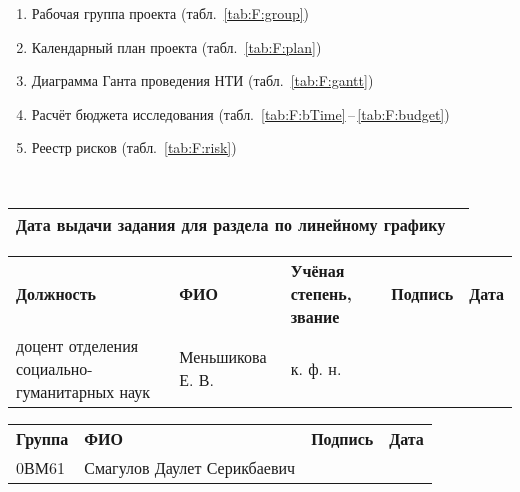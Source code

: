 \begin{longtable}
{{\begin{itshape}
\begin{enumerate}[labelsep=4pt,topsep=0pt,leftmargin=4pt]
    \item Рабочая группа проекта (табл.~\ref{tab:F:group})
    \item Календарный план проекта (табл.~\ref{tab:F:plan})
    \item Диаграмма Ганта проведения НТИ (табл.~\ref{tab:F:gantt})
    \item Расчёт бюджета исследования (табл.~\ref{tab:F:bTime}\,--\,\ref{tab:F:budget})
    \item Реестр рисков (табл.~\ref{tab:F:risk})
\end{enumerate}
\end{itshape}
}}
\\ \hline

\end{longtable}


\begin{tabularx}{\textwidth}
{|>{\hsize}L|>{\hsize}L|} \hline
\textbf{Дата выдачи задания для раздела по линейному графику}\bigstrut &
\\ \hline
\end{tabularx}

\vspace{2ex}

\begin{tabularx}{\textwidth}
{|>{\hsize}Y|>{\hsize}Y|>{\hsize}Y|>{\hsize}Y|>{\hsize}Y|}
     \bigstrut[t] \\
    \hline
    \scriptsize \textbf{Должность} 
        & \scriptsize \textbf{ФИО} 
        & \scriptsize \textbf{Учёная степень, звание} 
        & \scriptsize \textbf{Подпись} 
        & \scriptsize \textbf{Дата} \\
    \hline
    доцент отделения социально-гуманитарных наук & Меньшикова Е. В.\bigstrut & к. ф. н. & & \\ 
    \hline
\end{tabularx}

\vspace{2ex}

\begin{tabularx}{\textwidth}
{|>{\hsize}Y|>{\hsize}Y|>{\hsize}Y|>{\hsize}Y|}
     \\
    \hline
    \scriptsize \textbf{Группа}
        & \scriptsize \textbf{ФИО}
        & \scriptsize \textbf{Подпись}
        & \scriptsize \textbf{Дата} \\
    \hline 
    0ВМ61\bigstrut & Смагулов Даулет Серикбаевич & & \\ 
    \hline
\end{tabularx}



